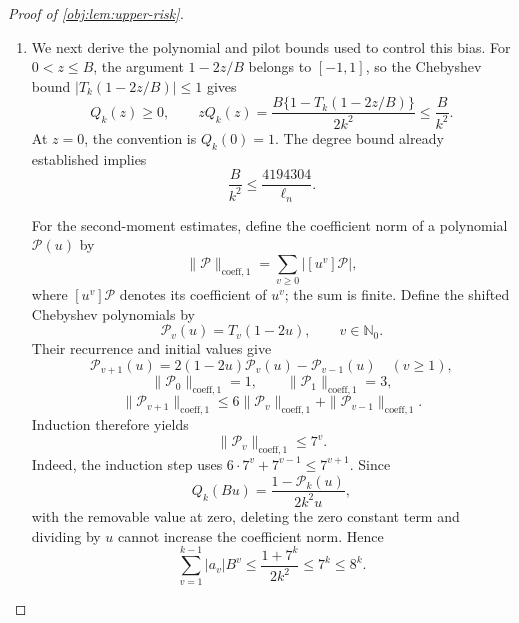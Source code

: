 \begin{proof}[Proof of \cref{obj:lem:upper-risk}]
\begin{enumerate}
For integers \(v\ge1\), use the falling factorial
\[
(C_j^\star)_v=\prod_{t=0}^{v-1}(C_j^\star-t).
\]
Conditional expectation of \(U_j^\star\), followed by the Poisson factorial-moment identity, gives
\[
\begin{aligned}
\mathbb E_\star[
(U_j^\star-C_j^\star/2)(C_j^\star-1)_{v-1}]
&=\eta_j\mathbb E_\star[(C_j^\star)_v]\\
&=\eta_j\zeta_j^v.
\end{aligned}
\]
Thus the coefficient identity in \cref{obj:def:mm-estimator} yields
\[
\mathbb E_\star[H_j^\star]
=\eta_j\{1-Q_k(\zeta_j)\}.
\]
Similarly, conditioning on \(C_j^\star>0\) gives
\[
\mathbb E_\star[D_j^\star]
=\eta_j\Pr_\star(C_j^\star>0)
=\eta_j(1-e^{-\zeta_j}).
\]
Independence of the pilot stream from the fourth stream now implies
\[
\mathbb E_\star[G_j^\star]-\eta_j
=-\eta_j\{\wp_jQ_k(\zeta_j)+(1-\wp_j)e^{-\zeta_j}\}.
\]
The first-stream mean and independence of the second stream from the pilot and fourth streams also give
\[
\mathbb E_\star[\tau_{\mathrm{lin}}]
=2\sum_{j\in\mathcal J}\epsilon_jt_j\eta_j,
\qquad
\mathbb E_\star[V_j^\star G_j^\star]
=w_j\mathbb E_\star[G_j^\star].
\]
Combining these identities with the cell decomposition of the target,
\[
\mathbb E_\star[\tau_{\mathrm{raw}}]-\tau(P)
=
2\sum_{j\in\mathcal J}
\epsilon_jw_j\{\mathbb E_\star[G_j^\star]-\eta_j\}.
\]

\item We next derive the polynomial and pilot bounds used to control this bias. For \(0<z\le B\), the argument \(1-2z/B\) belongs to \([-1,1]\), so the Chebyshev bound \(|T_k(1-2z/B)|\le1\) gives
\[
Q_k(z)\ge0,
\qquad
zQ_k(z)
=\frac{B\{1-T_k(1-2z/B)\}}{2k^2}
\le\frac{B}{k^2}.
\]
At \(z=0\), the convention is \(Q_k(0)=1\).
The degree bound already established implies
\[
\frac{B}{k^2}
\le\frac{4194304}{\ell_n}.
\]

For the second-moment estimates, define the coefficient norm of a polynomial
\(\mathcal P(u)\) by
\[
\|\mathcal P\|_{\mathrm{coeff},1}
=\sum_{v\ge0}|[u^v]\mathcal P|,
\]
where \([u^v]\mathcal P\) denotes its coefficient of \(u^v\); the sum is finite. Define the shifted Chebyshev polynomials by
\[
\mathcal P_v(u)=T_v(1-2u),
\qquad v\in\mathbb N_0.
\]
Their recurrence and initial values give
\[
\mathcal P_{v+1}(u)
=2(1-2u)\mathcal P_v(u)-\mathcal P_{v-1}(u)
\quad(v\ge1),
\]
\[
\|\mathcal P_0\|_{\mathrm{coeff},1}=1,
\qquad
\|\mathcal P_1\|_{\mathrm{coeff},1}=3,
\]
\[
\|\mathcal P_{v+1}\|_{\mathrm{coeff},1}
\le6\|\mathcal P_v\|_{\mathrm{coeff},1}
+\|\mathcal P_{v-1}\|_{\mathrm{coeff},1}.
\]
Induction therefore yields
\[
\|\mathcal P_v\|_{\mathrm{coeff},1}\le7^v.
\]
Indeed, the induction step uses
\(6\cdot7^v+7^{v-1}\le7^{v+1}\).
Since
\[
Q_k(Bu)=\frac{1-\mathcal P_k(u)}{2k^2u},
\]
with the removable value at zero, deleting the zero constant term and dividing by \(u\) cannot increase the coefficient norm. Hence
\[
\sum_{v=1}^{k-1}|a_v|B^v
\le\frac{1+7^k}{2k^2}
\le7^k
\le8^k.
\]


\end{enumerate}
\end{proof}
